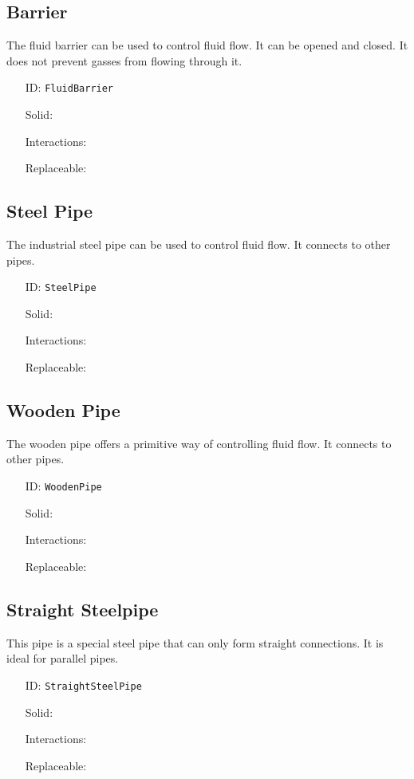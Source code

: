 \subsection{Barrier}\label{subsec:blocks_barrier}
The fluid barrier can be used to control fluid flow. It can be opened and closed.
It does not prevent gasses from flowing through it.
\newline
\begin{itemize}[nosep]
    \item[ID:] \texttt{FluidBarrier}
    \item[Solid:]  \Checkmark \item[Interactions:]  \Checkmark \item[Replaceable:]  \XSolidBrush
\end{itemize}

\subsection{Steel Pipe}\label{subsec:blocks_steel pipe}
The industrial steel pipe can be used to control fluid flow.
It connects to other pipes.
\newline
\begin{itemize}[nosep]
    \item[ID:] \texttt{SteelPipe}
    \item[Solid:]  \Checkmark \item[Interactions:]  \XSolidBrush \item[Replaceable:]  \XSolidBrush
\end{itemize}

\subsection{Wooden Pipe}\label{subsec:blocks_wooden pipe}
The wooden pipe offers a primitive way of controlling fluid flow.
It connects to other pipes.
\newline
\begin{itemize}[nosep]
    \item[ID:] \texttt{WoodenPipe}
    \item[Solid:]  \Checkmark \item[Interactions:]  \XSolidBrush \item[Replaceable:]  \XSolidBrush
\end{itemize}

\subsection{Straight Steelpipe}\label{subsec:blocks_straight steelpipe}
This pipe is a special steel pipe that can only form straight connections.
It is ideal for parallel pipes.
\newline
\begin{itemize}[nosep]
    \item[ID:] \texttt{StraightSteelPipe}
    \item[Solid:]  \Checkmark \item[Interactions:]  \XSolidBrush \item[Replaceable:]  \XSolidBrush
\end{itemize}

